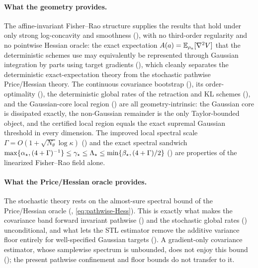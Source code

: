 \paragraph{What the geometry provides.}
The affine-invariant Fisher--Rao structure supplies the results that hold under only strong
log-concavity and smoothness (), with no third-order regularity and no
pointwise Hessian oracle: the exact expectation $A(a)=\mathbb{E}_{\rho_a}[\nabla^2V]$ that the deterministic
schemes use may equivalently be represented through Gaussian integration by parts using target
gradients (), which cleanly separates the deterministic exact-expectation theory from
the stochastic pathwise Price/Hessian theory. The continuous covariance bootstrap
(), its order-optimality (), the deterministic global
rates of the retraction and KL schemes (), and the Gaussian-core
local region () are all geometry-intrinsic: the Gaussian core is dissipated exactly,
the non-Gaussian remainder is the only Taylor-bounded object, and the certified local region equals the
exact supremal Gaussian threshold in every dimension. The improved local spectral scale
$\Gamma=O(1+\sqrt{N_\theta}\log\kappa)$ () and the exact spectral
sandwich $\max\{\alpha_\star,(4+\Gamma)^{-1}\}\leq\gamma_\star\leq\Lambda_\star\leq\min\{\beta_\star,(4+\Gamma)/2\}$
() are properties of the linearized Fisher--Rao field alone.

\paragraph{What the Price/Hessian oracle provides.}
The stochastic theory rests on the almost-sure spectral bound of the Price/Hessian oracle
(, \eqref{eq:pathwise-Hess}). This is exactly what makes the covariance band forward
invariant pathwise () and the stochastic global rates
() unconditional, and what lets the
STL estimator remove the additive variance floor entirely for well-specified Gaussian targets
(). A gradient-only covariance estimator, whose samplewise spectrum is
unbounded, does not enjoy this bound (); the present pathwise confinement and floor
bounds do not transfer to it.

